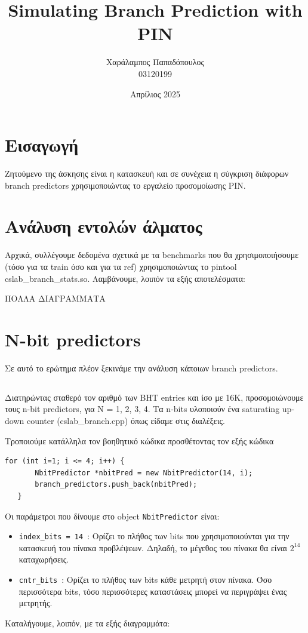 \documentclass{article}
\title{Simulating Branch Prediction with PIN}
\author{Χαράλαμπος Παπαδόπουλος \\03120199}
\date{Απρίλιος 2025}
\begin{document}
\maketitle

\section{Εισαγωγή}

Ζητούμενο της άσκησης είναι η κατασκευή και σε συνέχεια η σύγκριση διάφορων branch predictors χρησιμοποιώντας το εργαλείο προσομοίωσης PIN.

\section{Ανάλυση εντολών άλματος}
Αρχικά, συλλέγουμε δεδομένα σχετικά με τα benchmarks που θα χρησιμοποιήσουμε (τόσο για τα train όσο και για τα ref) χρησιμοποιώντας το pintool cslab\_branch\_stats.so. Λαμβάνουμε, λοιπόν τα εξής αποτελέσματα:

ΠΟΛΛΑ ΔΙΑΓΡΑΜΜΑΤΑ

\section{Ν-bit predictors}
Σε αυτό το ερώτημα πλέον ξεκινάμε την ανάλυση κάποιων branch predictors.
\subsection{}
 Διατηρώντας σταθερό τον αριθμό των BHT entries και ίσο με 16Κ, προσομοιώνουμε τους n-bit
predictors, για Ν = 1, 2, 3, 4. Τα n-bits υλοποιούν ένα saturating up-down counter (cslab\_branch.cpp) όπως είδαμε στις διαλέξεις.

Τροποιούμε κατάλληλα τον βοηθητικό κώδικα προσθέτοντας τον εξής κώδικα
\begin{lstlisting}[style=cppstyle]
   for (int i=1; i <= 4; i++) {
       NbitPredictor *nbitPred = new NbitPredictor(14, i);
       branch_predictors.push_back(nbitPred);
   }
\end{lstlisting}
Οι παράμετροι που δίνουμε στο object \texttt{NbitPredictor} είναι:
\begin{itemize}
    \item \texttt{index\_bits = 14}~: Ορίζει το πλήθος των bits που χρησιμοποιούνται για την κατασκευή του πίνακα προβλέψεων. Δηλαδή, το μέγεθος του πίνακα θα είναι $2^{14}$ καταχωρήσεις.
    \item \texttt{cntr\_bits}~: Ορίζει το πλήθος των bits κάθε μετρητή στον πίνακα. Όσο περισσότερα bits, τόσο περισσότερες καταστάσεις μπορεί να περιγράψει ένας μετρητής.

\end{itemize}
Καταλήγουμε, λοιπόν, με τα εξής διαγραμμάτα:
\end{document}
